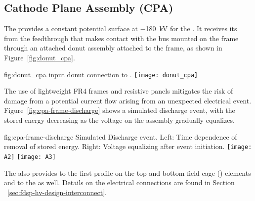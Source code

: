 \subsection{Cathode Plane Assembly (CPA)}

The  provides a constant potential surface at \SI{-180}{\kV}  for the .  It receives its  from the feedthrough that makes contact with the  bus mounted on the  frame through an attached donut assembly attached to the frame, as shown in Figure~\ref{fig:donut_cpa}. %

\begin{dunefigure}{fig:donut_cpa}{ input donut connection to .}
\texttt{[image: donut\_cpa]} %
\end{dunefigure}

The use of lightweight FR4 frames and resistive panels mitigates the risk of damage from a potential current flow arising from an 
unexpected electrical event.  Figure~\ref{fig:cpa-frame-discharge} shows a %
simulated discharge event, with the stored energy %
decreasing as the voltage on the assembly gradually equalizes. 

\begin{dunefigure}
{fig:cpa-frame-discharge}
{Simulated  Discharge event. Left: Time dependence of removal of stored energy. Right: Voltage equalizing after event initiation.}
\texttt{[image: A2]}
\texttt{[image: A3]}
\end{dunefigure}

The  also provides  to the first profile on the top and bottom field cage () elements and to the  as well. %
Details on the electrical connections are found in Section ~\ref{sec:fdsp-hv-design-interconnect}.

